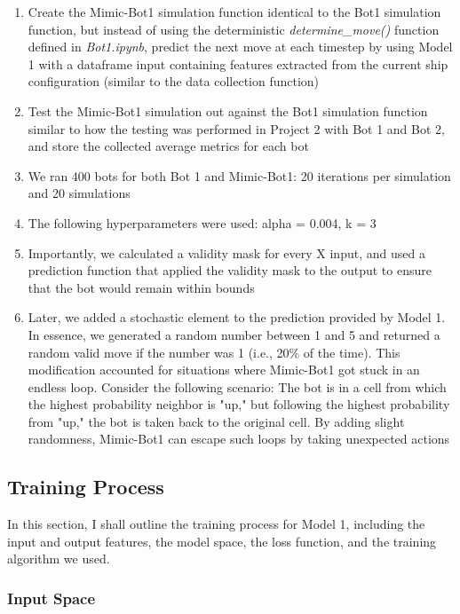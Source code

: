 \documentclass[11pt]{article}
\begin{document}
\begin{enumerate}
\begin{enumerate}
        \item Create the Mimic-Bot1 simulation function identical to the Bot1 simulation function, but instead of using the deterministic \emph{determine\_move()} function defined in \emph{Bot1.ipynb}, predict the next move at each timestep by using Model 1 with a dataframe input containing features extracted from the current ship configuration (similar to the data collection function)
        \item Test the Mimic-Bot1 simulation out against the Bot1 simulation function similar to how the testing was performed in Project 2 with Bot 1 and Bot 2, and store the collected average metrics for each bot
        \item We ran 400 bots for both Bot 1 and Mimic-Bot1: 20 iterations per simulation and 20 simulations
        \item The following hyperparameters were used: alpha = 0.004, k = 3
        \item Importantly, we calculated a validity mask for every X input, and used a prediction function that applied the validity mask to the output to ensure that the bot would remain within bounds
        \item Later, we added a stochastic element to the prediction provided by Model 1. In essence, we generated a random number between 1 and 5 and returned a random valid move if the number was 1 (i.e., 20\% of the time). This modification accounted for situations where Mimic-Bot1 got stuck in an endless loop. Consider the following scenario: The bot is in a cell from which the highest probability neighbor is "up," but following the highest probability from "up," the bot is taken back to the original cell. By adding slight randomness, Mimic-Bot1 can escape such loops by taking unexpected actions
    \end{enumerate}
\end{enumerate}

\subsection{Training Process}

In this section, I shall outline the training process for Model 1, including the input and output features, the model space, the loss function, and the training algorithm we used.

\subsubsection{Input Space}
\end{document}
